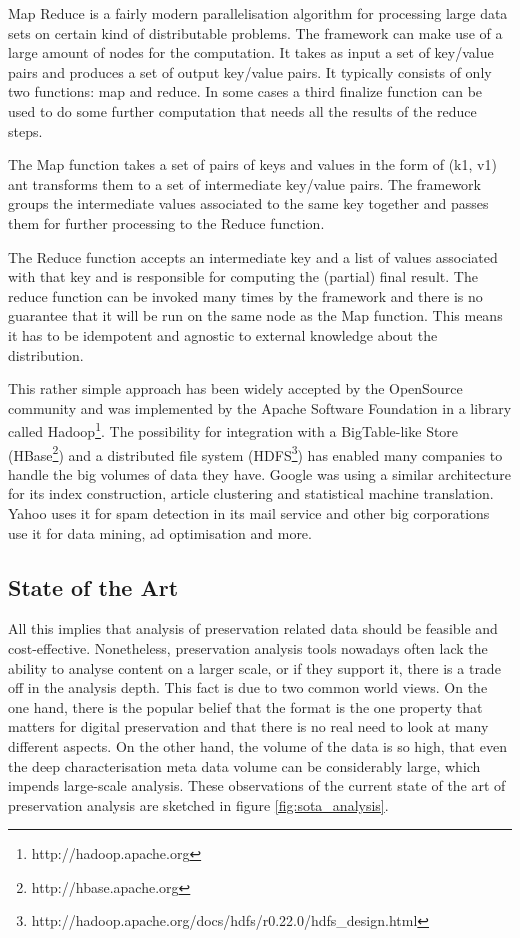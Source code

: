 Map Reduce is a fairly modern parallelisation algorithm for processing large data sets on certain kind of distributable problems. The framework can make use of a large amount of nodes for the computation. It takes as input a set of key/value pairs and produces a set of output key/value pairs. It typically consists of only two functions: map and reduce. In some cases a third finalize function can be used to do some further computation that needs all the results of the reduce steps.

The Map function takes a set of pairs of keys and values in the form of (k1, v1) ant transforms them to a set of intermediate key/value pairs. The framework groups the intermediate values associated to the same key together and passes them for further processing to the Reduce function.

The Reduce function accepts an intermediate key and a list of values associated with that key and is responsible for computing the (partial) final result. The reduce function can be invoked many times by the framework and there is no guarantee that it will be run on the same node as the Map function. This means it has to be idempotent and agnostic to external knowledge about the distribution.

This rather simple approach has been widely accepted by the OpenSource community and was implemented by the Apache Software Foundation in a library called Hadoop\footnote{http://hadoop.apache.org}. The possibility for integration with a BigTable-like Store \cite{Chang:2008:BDS:1365815.1365816} (HBase\footnote{http://hbase.apache.org}) and a distributed file system (HDFS\footnote{http://hadoop.apache.org/docs/hdfs/r0.22.0/hdfs\_design.html}) has enabled many companies to handle the big volumes of data they have. Google was using a similar architecture for its index construction, article clustering and statistical machine translation. Yahoo uses it for spam detection in its mail service and other big corporations use it for data mining, ad optimisation and more.

\subsection{State of the Art}
All this implies that analysis of preservation related data should be feasible and cost-effective. Nonetheless, preservation analysis tools nowadays often lack the ability to analyse content on a larger scale, or if they support it, there is a trade off in the analysis depth. This fact is due to two common world views. On the one hand, there is the popular belief that the format is the one property that matters for digital preservation \cite{citeulike:8904907} and that there is no real need to look at many different aspects. On the other hand, the volume of the data is so high, that even the deep characterisation meta data volume can be considerably large, which impends large-scale analysis. These observations of the current state of the art of preservation analysis are sketched in figure \ref{fig:sota_analysis}.

